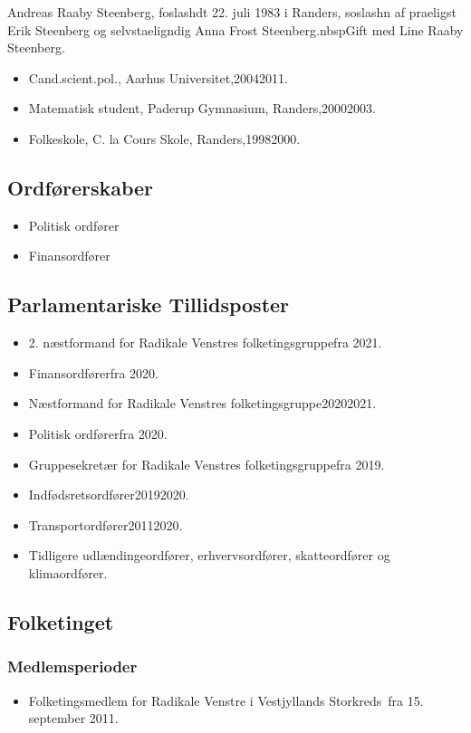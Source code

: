 \documentclass[11pt, a4paper]{awesome-cv}
\begin{document}
\makecvheader[R]
\makelettertitle
\begin{cvletter}
Andreas Raaby Steenberg, foslashdt 22. juli 1983 i Randers, soslashn af praeligst Erik Steenberg og selvstaeligndig Anna Frost Steenberg.nbspGift med Line Raaby Steenberg.

\begin{itemize}
\item Cand.scient.pol., Aarhus Universitet,20042011.
\item Matematisk student, Paderup Gymnasium, Randers,20002003.
\item Folkeskole, C. la Cours Skole, Randers,19982000.
\end{itemize}
\subsection*{Ordførerskaber}
\begin{itemize}
\item Politisk ordfører
\item Finansordfører
\end{itemize}
\subsection*{Parlamentariske Tillidsposter}
\begin{itemize}
\item 2. næstformand for Radikale Venstres folketingsgruppefra 2021.
\item Finansordførerfra 2020.
\item Næstformand for Radikale Venstres folketingsgruppe20202021.
\item Politisk ordførerfra 2020.
\item Gruppesekretær for Radikale Venstres folketingsgruppefra 2019.
\item Indfødsretsordfører20192020.
\item Transportordfører20112020.
\item Tidligere udlændingeordfører, erhvervsordfører, skatteordfører og klimaordfører.
\end{itemize}
\subsection*{Folketinget}
\subsubsection*{Medlemsperioder}
\begin{itemize}
\item Folketingsmedlem for Radikale Venstre i Vestjyllands Storkreds fra 15. september 2011.
\end{itemize}

\end{cvletter}
\end{document}
